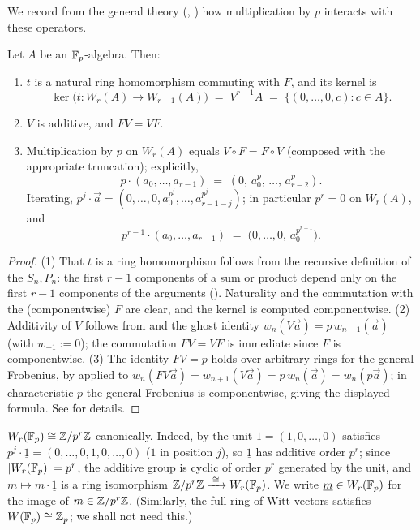 We record from the general theory (\cite[II, \S6]{serreLF},
\cite[\S2]{Rabinoff2014Witt}) how multiplication by $p$ interacts with these
operators.

\begin{prop}\label{prop:witt_multiplication_by_p}
Let $A$ be an $\mathbb{F}_p$-algebra. Then:
\begin{enumerate}
    \item $t$ is a natural ring homomorphism commuting with $F$, and its kernel is
    \[
    \ker\bigl(t \colon W_r(A) \to W_{r-1}(A)\bigr)
    \;=\; V^{r-1} A \;=\; \{(0, \dots, 0, c) : c \in A\}.
    \]
    \item $V$ is additive, and $F V = V F$.
    \item Multiplication by $p$ on $W_r(A)$ equals $V \circ F = F \circ V$
    (composed with the appropriate truncation); explicitly,
    \[
    p \cdot (a_0, \dots, a_{r-1}) \;=\; (0,\, a_0^p,\, \dots,\, a_{r-2}^p).
    \]
    Iterating, $p^j \cdot \vec a = (0, \dots, 0, a_0^{p^j}, \dots, a_{r-1-j}^{p^j})$;
    in particular $p^r = 0$ on $W_r(A)$, and
    \begin{equation}\label{eq:witt_p_to_r_minus_1}
    p^{r-1} \cdot (a_0, \dots, a_{r-1}) \;=\; \bigl(0, \dots, 0,\, a_0^{p^{r-1}}\bigr).
    \end{equation}
\end{enumerate}
\end{prop}

\begin{proof}
(1) That $t$ is a ring homomorphism follows from the recursive definition of the
$S_n, P_n$: the first $r-1$ components of a sum or product depend only on the first
$r-1$ components of the arguments (). Naturality and
the commutation with the (componentwise) $F$ are clear, and the kernel is computed
componentwise. (2) Additivity of $V$ follows from  and
the ghost identity $w_n(V\vec a) = p\, w_{n-1}(\vec a)$ (with $w_{-1} := 0$); the
commutation $FV = VF$ is immediate since $F$ is componentwise. (3) The identity
$F V = p$ holds over arbitrary rings for the general Frobenius, by
 applied to
$w_n(FV\vec a) = w_{n+1}(V \vec a) = p\, w_n(\vec a) = w_n(p \vec a)$; in
characteristic $p$ the general Frobenius is componentwise, giving the displayed
formula. See \cite[II, \S6, Proposition~8 ff.]{serreLF} for details.
\end{proof}

\begin{example}\label{example:witt_of_Fp}
$W_r(\mathbb{F}_p) \cong \mathbb{Z}/p^r\mathbb{Z}$ canonically. Indeed, by
 the unit $\underline 1 = (1, 0, \dots, 0)$ satisfies
$p^j \cdot \underline 1 = (0, \dots, 0, 1, 0, \dots, 0)$ ($1$ in position $j$), so
$\underline 1$ has additive order $p^r$; since $|W_r(\mathbb{F}_p)| = p^r$, the additive group
is cyclic of order $p^r$ generated by the unit, and $m \mapsto m \cdot \underline 1$
is a ring isomorphism $\mathbb{Z}/p^r\mathbb{Z} \xrightarrow{\;\cong\;} W_r(\mathbb{F}_p)$. We write
$\underline m \in W_r(\mathbb{F}_p)$ for the image of $m \in \mathbb{Z}/p^r\mathbb{Z}$. (Similarly, the full
ring of Witt vectors satisfies $W(\mathbb{F}_p) \cong \mathbb{Z}_p$; we shall not need this.)
\end{example}

